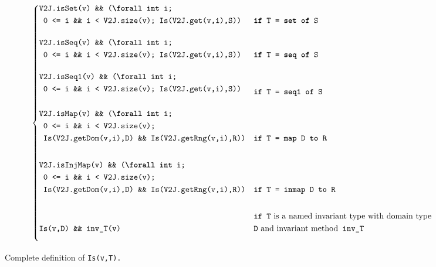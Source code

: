 \begin{figure*}[ht]
\begin{mdframed}
\begin{equation*}
\begin{cases}
  \!\begin{aligned}[b]
    & \texttt{V2J.isSet(v) \&\& (\kw{\textbackslash forall} \kw{int} i;}\\
    & \texttt{ 0 <= i \&\& i < V2J.size(v); Is(V2J.get(v,i),S))}
    \end{aligned}           & \kw{if} \texttt{ T = \kw{set} \kw{of} S}\\[\caseSpaceSeqSet]

  \!\begin{aligned}[b]
    & \texttt{V2J.isSeq(v) \&\& (\kw{\textbackslash forall} \kw{int} i;} \\
    & \texttt{ 0 <= i \&\& i < V2J.size(v); Is(V2J.get(v,i),S))}
    \end{aligned}           & \kw{if} \texttt{ T = \kw{seq} \kw{of} S}\\[\caseSpaceSeqSet]

  \!\begin{aligned}[b]
    & \texttt{V2J.isSeq1(v) \&\& (\kw{\textbackslash forall} \kw{int} i;} \\
    & \texttt{ 0 <= i \&\& i < V2J.size(v); Is(V2J.get(v,i),S))} \\
    \end{aligned}           & \kw{if} \texttt{ T = \kw{seq1} \kw{of} S}\\[\caseSpaceSeqSet]

  \!\begin{aligned}[b]
    & \texttt{V2J.isMap(v) \&\& (\kw{\textbackslash forall} \kw{int} i;} \\
    & \texttt{ 0 <= i \&\& i < V2J.size(v);} \\
    &\texttt{ Is(V2J.getDom(v,i),D) \&\& Is(V2J.getRng(v,i),R))}
    \end{aligned}           & \kw{if} \texttt{ T = \kw{map} D \kw{to} R}\\[\caseSpaceMap]

  \!\begin{aligned}[b]
    & \texttt{V2J.isInjMap(v) \&\& (\kw{\textbackslash forall} \kw{int} i;} \\
    & \texttt{ 0 <= i \&\& i < V2J.size(v);} \\
    &\texttt{ Is(V2J.getDom(v,i),D) \&\& Is(V2J.getRng(v,i),R))}
    \end{aligned}           & \kw{if} \texttt{ T = \kw{inmap} D \kw{to} R}\\[\caseSpaceMap]
    
  \texttt{Is(v,D) \&\& inv\_T(v)} &
  \!\begin{aligned}[b]
    & \kw{if} \texttt{ T} \text{ is a named invariant type with domain type }\\ 
    & \texttt{D} \text{ and invariant method} \texttt{ inv\_T}
    \end{aligned}\\[10.0\caseSpace]

\end{cases}
\end{equation*}
\end{mdframed}
\caption{Complete definition of \texttt{Is(v,T).}}
\label{fig:f-complete}
\end{figure*}

